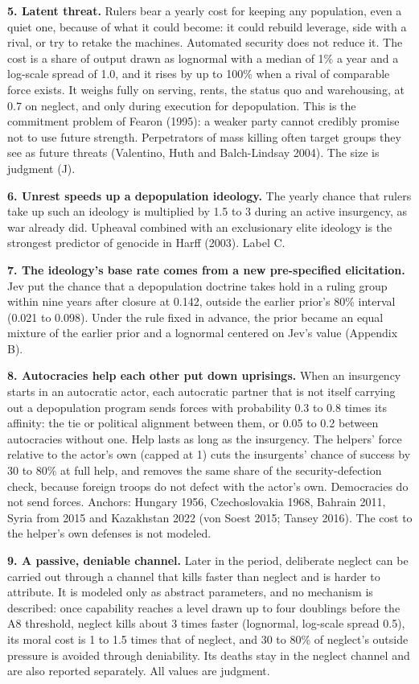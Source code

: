 \documentclass[
  10pt,
]{article}
\begin{document}
\textbf{5. Latent threat.} Rulers bear a yearly cost for keeping any population, even a quiet one,
because of what it could become: it could rebuild leverage, side with a rival, or try to retake the
machines. Automated security does not reduce it. The cost is a share of output drawn as lognormal
with a median of 1\% a year and a log-scale spread of 1.0, and it rises by up to 100\% when a rival
of comparable force exists. It weighs fully on serving, rents, the status quo and warehousing, at
0.7 on neglect, and only during execution for depopulation. This is the commitment problem of Fearon
(1995): a weaker party cannot credibly promise not to use future strength. Perpetrators of mass
killing often target groups they see as future threats (Valentino, Huth and Balch-Lindsay 2004). The
size is judgment (J).

\textbf{6. Unrest speeds up a depopulation ideology.} The yearly chance that rulers take up such an
ideology is multiplied by 1.5 to 3 during an active insurgency, as war already did. Upheaval
combined with an exclusionary elite ideology is the strongest predictor of genocide in Harff (2003).
Label C.

\textbf{7. The ideology's base rate comes from a new pre-specified elicitation.} Jev put the chance
that a depopulation doctrine takes hold in a ruling group within nine years after closure at 0.142,
outside the earlier prior's 80\% interval (0.021 to 0.098). Under the rule fixed in advance, the
prior became an equal mixture of the earlier prior and a lognormal centered on Jev's value (Appendix
B).

\textbf{8. Autocracies help each other put down uprisings.} When an insurgency starts in an
autocratic actor, each autocratic partner that is not itself carrying out a depopulation program
sends forces with probability 0.3 to 0.8 times its affinity: the tie or political alignment between
them, or 0.05 to 0.2 between autocracies without one. Help lasts as long as the insurgency. The
helpers' force relative to the actor's own (capped at 1) cuts the insurgents' chance of success by
30 to 80\% at full help, and removes the same share of the security-defection check, because foreign
troops do not defect with the actor's own. Democracies do not send forces. Anchors: Hungary 1956,
Czechoslovakia 1968, Bahrain 2011, Syria from 2015 and Kazakhstan 2022 (von Soest 2015; Tansey
2016). The cost to the helper's own defenses is not modeled.

\textbf{9. A passive, deniable channel.} Later in the period, deliberate neglect can be carried out
through a channel that kills faster than neglect and is harder to attribute. It is modeled only as
abstract parameters, and no mechanism is described: once capability reaches a level drawn up to four
doublings before the A8 threshold, neglect kills about 3 times faster (lognormal, log-scale spread
0.5), its moral cost is 1 to 1.5 times that of neglect, and 30 to 80\% of neglect's outside pressure
is avoided through deniability. Its deaths stay in the neglect channel and are also reported
separately. All values are judgment.
\end{document}
